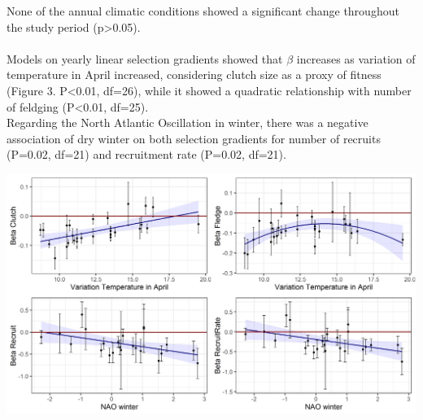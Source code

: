 \documentclass[a0paper,portrait]{baposter}
\begin{document}
\begin{poster}
{%

None of the annual climatic conditions showed a significant change throughout the study period (p>0.05).
\\
\\
Models on yearly linear selection gradients showed that $\beta$ increases as variation of temperature in April increased, considering clutch size as a proxy of fitness (Figure 3. P<0.01, df=26), while it showed a quadratic relationship with number of feldging (P<0.01, df=25).\\
Regarding the North Atlantic Oscillation in winter, there was a negative association of dry winter on both selection gradients for number of recruits (P=0.02, df=21) and recruitment rate (P=0.02, df=21).


\begin{center}
\includegraphics[width=0.90\linewidth]{Figure4_1}
\end{center}
}


\end{poster}
\end{document}
